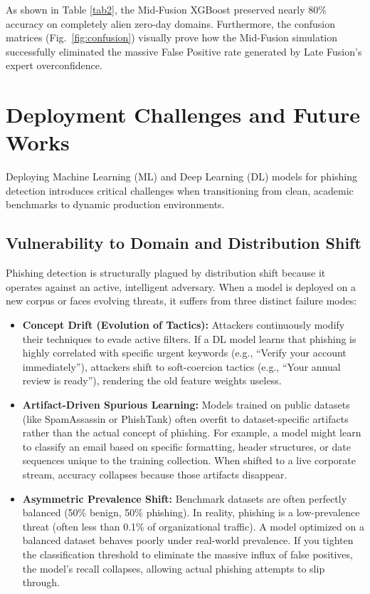 \documentclass[conference]{IEEEtran}
\begin{document}
As shown in Table \ref{tab2}, the Mid-Fusion XGBoost preserved nearly 80\% accuracy on completely alien zero-day domains. Furthermore, the confusion matrices (Fig.~\ref{fig:confusion}) visually prove how the Mid-Fusion simulation successfully eliminated the massive False Positive rate generated by Late Fusion's expert overconfidence.

\section{Deployment Challenges and Future Works}
Deploying Machine Learning (ML) and Deep Learning (DL) models for phishing detection introduces critical challenges when transitioning from clean, academic benchmarks to dynamic production environments. 

\subsection{Vulnerability to Domain and Distribution Shift}
Phishing detection is structurally plagued by distribution shift because it operates against an active, intelligent adversary. When a model is deployed on a new corpus or faces evolving threats, it suffers from three distinct failure modes:
\begin{itemize}
    \item \textbf{Concept Drift (Evolution of Tactics):} Attackers continuously modify their techniques to evade active filters. If a DL model learns that phishing is highly correlated with specific urgent keywords (e.g., ``Verify your account immediately''), attackers shift to soft-coercion tactics (e.g., ``Your annual review is ready''), rendering the old feature weights useless.
    \item \textbf{Artifact-Driven Spurious Learning:} Models trained on public datasets (like SpamAssassin or PhishTank) often overfit to dataset-specific artifacts rather than the actual concept of phishing. For example, a model might learn to classify an email based on specific formatting, header structures, or date sequences unique to the training collection. When shifted to a live corporate stream, accuracy collapses because those artifacts disappear.
    \item \textbf{Asymmetric Prevalence Shift:} Benchmark datasets are often perfectly balanced (50\% benign, 50\% phishing). In reality, phishing is a low-prevalence threat (often less than 0.1\% of organizational traffic). A model optimized on a balanced dataset behaves poorly under real-world prevalence. If you tighten the classification threshold to eliminate the massive influx of false positives, the model's recall collapses, allowing actual phishing attempts to slip through.
\end{itemize}
\end{document}
